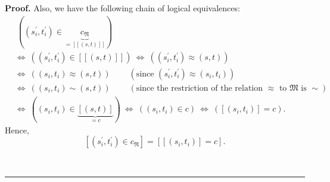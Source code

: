 \documentclass
[numbers=enddot,12pt,final,onecolumn,notitlepage,abstracton]{scrartcl}%
\theoremstyle{definition}
\newenvironment{proof}[1][Proof]{\noindent\textbf{#1.} }{\ \rule{0.5em}{0.5em}}
\begin{document}
\begin{proof}
Also, we have the following chain of logical equivalences:%
\begin{align*}
&  \ \left(  \left(  s_{i}^{\prime},t_{i}^{\prime}\right)  \in
\underbrace{c_{\mathfrak{N}}}_{=\left[  \left[  \left(  s,t\right)  \right]
\right]  }\right) \\
&  \Longleftrightarrow\ \left(  \left(  s_{i}^{\prime},t_{i}^{\prime}\right)
\in\left[  \left[  \left(  s,t\right)  \right]  \right]  \right)
\ \Longleftrightarrow\ \left(  \left(  s_{i}^{\prime},t_{i}^{\prime}\right)
\approx\left(  s,t\right)  \right) \\
&  \Longleftrightarrow\ \left(  \left(  s_{i},t_{i}\right)  \approx\left(
s,t\right)  \right)  \ \ \ \ \ \ \ \ \ \ \left(  \text{since }\left(
s_{i}^{\prime},t_{i}^{\prime}\right)  \approx\left(  s_{i},t_{i}\right)
\right) \\
&  \Longleftrightarrow\ \left(  \left(  s_{i},t_{i}\right)  \sim\left(
s,t\right)  \right)  \ \ \ \ \ \ \ \ \ \ \left(  \text{since the restriction
of the relation }\approx\text{ to }\mathfrak{M}\text{ is }\sim\right) \\
&  \Longleftrightarrow\ \left(  \left(  s_{i},t_{i}\right)  \in
\underbrace{\left[  \left(  s,t\right)  \right]  }_{=c}\right)
\ \Longleftrightarrow\ \left(  \left(  s_{i},t_{i}\right)  \in c\right)
\ \Longleftrightarrow\ \left(  \left[  \left(  s_{i},t_{i}\right)  \right]
=c\right)  .
\end{align*}
Hence,%
\begin{equation}
\left[  \left(  s_{i}^{\prime},t_{i}^{\prime}\right)  \in c_{\mathfrak{N}%
}\right]  =\left[  \left[  \left(  s_{i},t_{i}\right)  \right]  =c\right]  .
\label{pf.thm.BCL.a.hasdiff1.eq2}%
\end{equation}



\end{proof}
\end{document}
